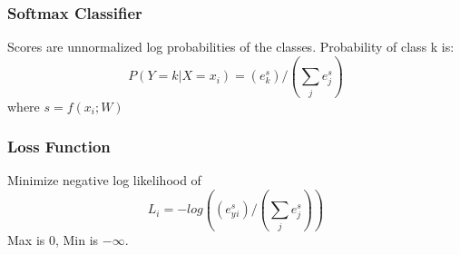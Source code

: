 \documentclass[11pt]{article}
\begin{document}
\subsubsection{Softmax Classifier}
\label{sec-3-3-3}
Scores are unnormalized log probabilities of the classes. Probability of class k is:
\begin{equation}
P(Y=k | X=x_i) = (e^s_k)/ (\sum_{j} e^s_j) 
\end{equation}
where $s = f(x_i; W)$
\subsubsection{Loss Function}
\label{sec-3-3-4}
Minimize negative log likelihood of 
\begin{equation}
L_i = -log((e^s_y_i)/ (\sum_{j} e^s_j) )
\end{equation}
Max is 0, Min is $-\infty$.
\end{document}
